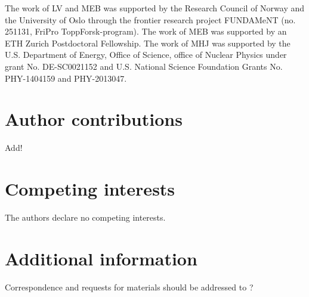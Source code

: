 \documentclass[superscriptaddress,unsortedaddress,
 amsmath,amssymb,
 aps,
]{revtex4-2}
\begin{document}


\begin{acknowledgments}

The work of LV and MEB was supported by the Research Council of Norway and the University of Oslo through the frontier research project FUNDAMeNT (no. 251131, FriPro ToppForsk-program). 
The work of MEB was supported by an ETH Zurich Postdoctoral Fellowship. 
The work of MHJ was supported by the U.S. Department of Energy,
Office of Science, office of Nuclear Physics under grant
No. DE-SC0021152 and U.S. National Science Foundation Grants
No. PHY-1404159 and PHY-2013047. 


\end{acknowledgments}

\section*{Author contributions}
Add! 

\section*{Competing interests}
The authors declare no competing interests.

\section*{Additional information}
Correspondence and requests for materials should be addressed to ?
\end{document}
